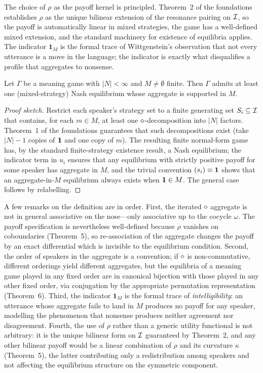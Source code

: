 The choice of $\rho$ as the payoff kernel is principled. Theorem~2 of
the foundations~\cite{Nash1950} establishes $\rho$ as the unique
bilinear extension of the resonance pairing on $\mathcal{I}$, so the payoff
is automatically linear in mixed strategies, the game has a well-defined
mixed extension, and the standard machinery for existence of equilibria
applies. The indicator $\mathbf{1}_M$ is the formal trace of
Wittgenstein's observation that not every utterance is a move in the
language; the indicator is exactly what disqualifies a profile that
aggregates to nonsense.

\begin{theorem}\label{thm:existence-conv}
Let $\Gamma$ be a meaning game with $|N|<\infty$ and $M\neq\emptyset$
finite. Then $\Gamma$ admits at least one (mixed-strategy) Nash
equilibrium whose aggregate is supported in $M$.
\end{theorem}

\begin{proof}[Proof sketch]
Restrict each speaker's strategy set to a finite generating set
$S_i\subseteq\mathcal{I}$ that contains, for each $m\in M$, at least one
$\mathbin{\diamond}$-decomposition into $|N|$ factors. Theorem~1 of the
foundations guarantees that such decompositions exist (take $|N|-1$
copies of $\mathbf{1}$ and one copy of $m$). The resulting finite normal-form
game has, by the standard finite-strategy existence result, a Nash
equilibrium; the indicator term in $u_i$ ensures that any equilibrium
with strictly positive payoff for some speaker has aggregate in $M$,
and the trivial convention $(s_i)\equiv\mathbf{1}$ shows that an aggregate-in-$M$
equilibrium always exists when $\mathbf{1}\in M$. The general case follows by
relabelling.\end{proof}

A few remarks on the definition are in order. First, the iterated
$\mathbin{\diamond}$ aggregate is not in general associative on the nose---only
associative up to the cocycle $\omega$. The payoff specification is
nevertheless well-defined because $\rho$ vanishes on coboundaries
(Theorem~5), so re-association of the aggregate changes the payoff by
an exact differential which is invisible to the equilibrium condition.
Second, the order of speakers in the aggregate is a convention; if
$\mathbin{\diamond}$ is non-commutative, different orderings yield different
aggregates, but the equilibria of a meaning game played in any fixed
order are in canonical bijection with those played in any other fixed
order, via conjugation by the appropriate permutation
representation (Theorem~6). Third, the indicator $\mathbf{1}_M$ is the
formal trace of \emph{intelligibility}: an utterance whose aggregate
fails to land in $M$ produces no payoff for any speaker, modelling the
phenomenon that nonsense produces neither agreement nor disagreement.
Fourth, the use of $\rho$ rather than a generic utility functional is
not arbitrary: it is the unique bilinear form on $\mathcal{I}$ guaranteed
by Theorem~2, and any other bilinear payoff would be a linear
combination of $\rho$ and its curvature $\kappa$ (Theorem~5), the
latter contributing only a redistribution among speakers and not
affecting the equilibrium structure on the symmetric component.

